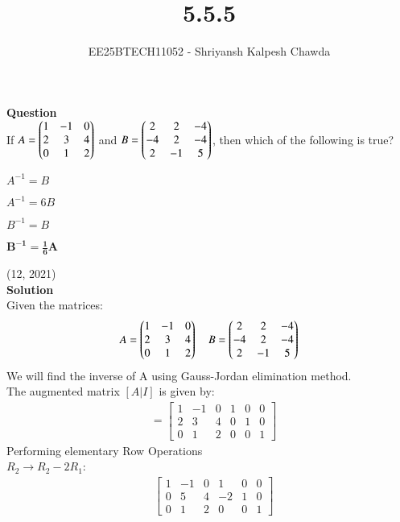 \documentclass[article]{IEEEtran}
\begin{document}
	\title{5.5.5}
	\author{EE25BTECH11052 - Shriyansh Kalpesh Chawda}
	\maketitle
\textbf{Question}\\
	If $A = \begin{pmatrix}1 & -1 & 0 \\ 2 & 3 & 4 \\ 0 & 1 & 2\end{pmatrix}$ and $B = \begin{pmatrix}2 & 2 & -4 \\ -4 & 2 & -4 \\ 2 & -1 & 5\end{pmatrix}$, then which of the following is true?\\
	\begin{enumerate}
	\end{enumerate}
	\hfill{(12, 2021)}\\
	\textbf{Solution}\\
	Given the matrices:
	\begin{align}
		A = \begin{pmatrix} 1 & -1 & 0 \\ 2 & 3 & 4 \\ 0 & 1 & 2 \end{pmatrix} \quad B = \begin{pmatrix} 2 & 2 & -4 \\ -4 & 2 & -4 \\ 2 & -1 & 5 \end{pmatrix}
	\end{align}
	We will find the inverse of A using Gauss-Jordan elimination method.\\
	The augmented matrix $[A | I]$ is given by:
	\begin{align}
		[A | I] &= \left[ \begin{array}{ccc|ccc} 1 & -1 & 0 & 1 & 0 & 0 \\ 2 & 3 & 4 & 0 & 1 & 0 \\ 0 & 1 & 2 & 0 & 0 & 1 \end{array} \right]
	\end{align}
Performing elementary Row Operations\\
 $R_2 \to R_2 - 2R_1$:
	\begin{align}
		&\left[ \begin{array}{ccc|ccc} 1 & -1 & 0 & 1 & 0 & 0 \\ 0 & 5 & 4 & -2 & 1 & 0 \\ 0 & 1 & 2 & 0 & 0 & 1 \end{array} \right]
	\end{align}
\end{document}
